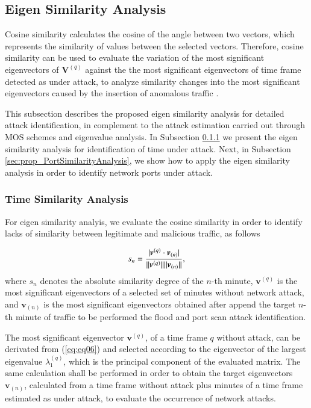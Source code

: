 \documentclass[review]{elsarticle}
\DeclarePairedDelimiter\abs{\lvert}{\rvert}%
\DeclarePairedDelimiter\norm{\lVert}{\rVert}%
\begin{document}
\subsection{Eigen Similarity Analysis}
\label{sec:prop_EigenSimilarityAnalysis}

Cosine similarity calculates the cosine of the angle between two vectors, which represents the similarity of values between the selected vectors. Therefore, cosine similarity can be used to evaluate the variation of the most significant eigenvectors of $\boldsymbol{V}^{(q)}$ against the the most significant eigenvectors of time frame detected as under attack, to analyze similarity changes into the most significant eigenvectors caused by the insertion of anomalous traffic \cite{Lee2013}. 

This subsection describes the proposed eigen similarity analysis for detailed attack identification, in complement to the attack estimation carried out through MOS schemes and eigenvalue analysis. In Subsection \ref{sec:prop_TimeSimilarityAnalysis} we present the eigen similarity analysis for identification of time under attack. Next, in Subsection \ref{sec:prop_PortSimilarityAnalysis}, we show how to apply the eigen similarity analysis in order to identify network ports under attack.

\subsubsection{Time Similarity Analysis}
\label{sec:prop_TimeSimilarityAnalysis}

For eigen similarity analyis, we evaluate the cosine similarity in order to identify lacks of similarity between legitimate and malicious traffic, as follows

\begin{equation}\label{eq:eq11}
s_n = \frac{\abs{\boldsymbol{v}^{(q)} \cdot \boldsymbol{v}_{(n)}}}{\norm{\boldsymbol{v}^{(q)}}\norm{\boldsymbol{v}_{(n)}}},
\end{equation}
where $s_n$ denotes the absolute similarity degree of the $n$-th minute, $\boldsymbol{v}^{(q)}$ is the most significant eigenvectors of a selected set of minutes without network attack, and $\boldsymbol{v}_{(n)}$ is the most significant eigenvectors obtained after append the target $n$-th minute of traffic to be performed the flood and port scan attack identification.

The most significant eigenvector $\boldsymbol{v}^{(q)}$, of a time frame $q$ without attack, can be derivated from (\ref{eq:eq06}) and selected according to the eigenvector of the largest eigenvalue $\lambda_1^{(q)}$, which is the principal component of the evaluated matrix. The same calculation shall be performed in order to obtain the target eigenvectors $\boldsymbol{v}_{(n)}$, calculated from a time frame without attack plus minutes of a time frame estimated as under attack, to evaluate the occurrence of network attacks. 
\end{document}
